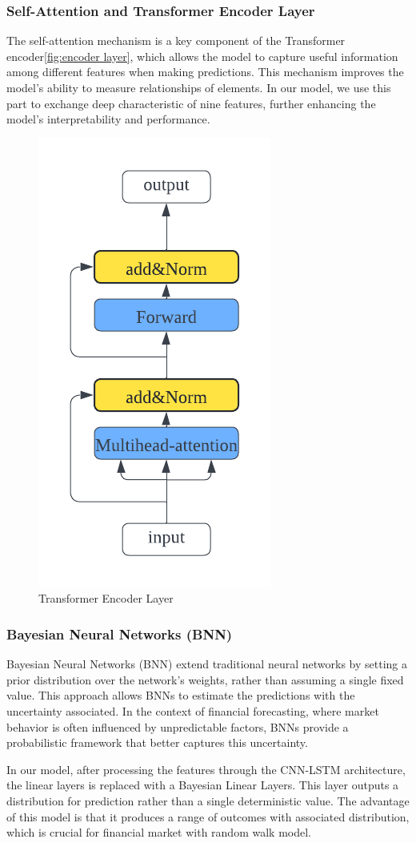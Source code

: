\documentclass[final-report]{report-template}
\begin{document}
\subsubsection{\textbf{Self-Attention and Transformer Encoder Layer}}
The self-attention mechanism is a key component of the Transformer encoder\autoref{fig:encoder layer}, which allows the model to capture useful information among different features when making predictions. This mechanism improves the model's ability to measure relationships of elements. In our model, we use this part to exchange deep characteristic of nine features, further enhancing the model's interpretability and performance.\cite{vaswani2017attention,li2019enhancing,wen2023transformers}
\begin{figure}[h]
    \centering
    \includegraphics[width=0.5\linewidth, height=0.5\textwidth]{figures/multiattention.png}
    \caption{Transformer Encoder Layer}
    \label{fig:encoder layer}
\end{figure}
\subsubsection{\textbf{Bayesian Neural Networks (BNN)}}
Bayesian Neural Networks (BNN) extend traditional neural networks by setting a prior distribution over the network's weights, rather than assuming a single fixed value. This approach allows BNNs to estimate the predictions with the uncertainty associated. In the context of financial forecasting, where market behavior is often influenced by unpredictable factors, BNNs provide a probabilistic framework that better captures this uncertainty.

In our model, after processing the features through the CNN-LSTM architecture, the linear layers is replaced with a Bayesian Linear Layers. This layer outputs a distribution for prediction rather than a single deterministic value. The advantage of this model is that it produces a range of outcomes with associated distribution, which is crucial for financial market with random walk model. 
\end{document}
